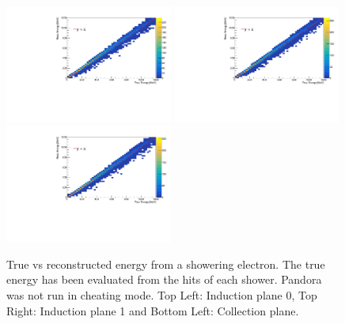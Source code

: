 \begin{figure}[h!]
	\centering
	\includegraphics[width = 0.49\textwidth]{figures-chap4/non_cheat/ESTAR_plane0_true_vs_reco.pdf}
	\includegraphics[width = 0.49\textwidth]{figures-chap4/non_cheat/ESTAR_plane1_true_vs_reco.pdf}
	\includegraphics[width = 0.49\textwidth]{figures-chap4/non_cheat/ESTAR_plane2_true_vs_reco.pdf}
	\captionsetup{width=0.45\textwidth}
	\parbox[b]{0.49\textwidth}%
	{
		\caption[True vs reconstructed energy from the ESTAR method without using Pandora in cheating mode.]
		{True vs reconstructed energy from a showering electron. The true energy has been evaluated from the hits of each shower. Pandora was not run in cheating mode. Top Left: Induction plane 0, Top Right: Induction plane 1 and Bottom Left: Collection plane. \\}
		\label{fig:ESTAR_true_vs_reco_no_cheat}}
\end{figure}

